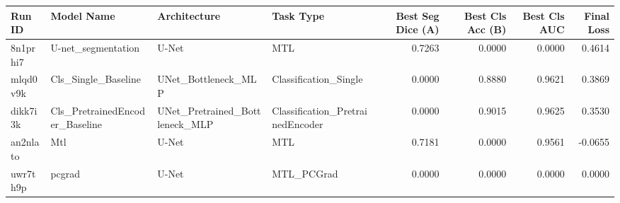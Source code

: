 \begin{tabular}{llllrrrr}
\toprule
Run ID & Model Name & Architecture & Task Type & Best Seg Dice (A) & Best Cls Acc (B) & Best Cls AUC & Final Loss \\
\midrule
8n1prhi7 & U-net_segmentation & U-Net & MTL & 0.7263 & 0.0000 & 0.0000 & 0.4614 \\
mlqd0v9k & Cls_Single_Baseline & UNet_Bottleneck_MLP & Classification_Single & 0.0000 & 0.8880 & 0.9621 & 0.3869 \\
dikk7i3k & Cls_PretrainedEncoder_Baseline & UNet_Pretrained_Bottleneck_MLP & Classification_PretrainedEncoder & 0.0000 & 0.9015 & 0.9625 & 0.3530 \\
an2nlato & Mtl & U-Net & MTL & 0.7181 & 0.0000 & 0.9561 & -0.0655 \\
uwr7th9p & pcgrad & U-Net & MTL_PCGrad & 0.0000 & 0.0000 & 0.0000 & 0.0000 \\
\bottomrule
\end{tabular}
